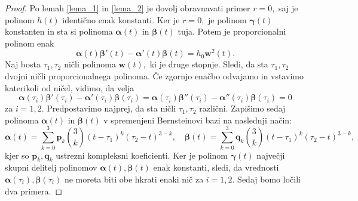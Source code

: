 \documentclass[12pt,a4paper,twoside]{article}
\theoremstyle{definition} %
\theoremstyle{plain} %
\numberwithin{equation}{section}  %
\newcommand{\pV}{\mathbf{p}}
\newcommand{\qV}{\mathbf{q}}
\newcommand{\wV}{\mathbf{w}}
\newcommand{\balpha}{\boldsymbol \alpha}
\newcommand{\bbeta}{\boldsymbol \beta}
\newcommand{\bgamma}{\boldsymbol \gamma}
\begin{document}
\begin{proof}
	Po lemah \ref{lema_1} in \ref{lema_2} je dovolj obravnavati primer $r=0,$ saj je polinom $h(t)$ identično enak konstanti. Ker je $r=0,$ je polinom $\bgamma(t)$ konstanten in sta si polinoma $\balpha(t)$ in $\bbeta(t)$ tuja. Potem je proporcionalni polinom enak
	\begin{equation}
		\balpha(t)\bbeta'(t)-\balpha'(t)\bbeta(t)=h_0\wV^2(t).
	\end{equation}
	Naj bosta $\tau_1,\tau_2$ ničli polinoma $\wV(t),$ ki je druge stopnje. Sledi, da sta $\tau_1,\tau_2$ dvojni ničli proporcionalnega polinoma. Če zgornjo enačbo odvajamo in vstavimo katerikoli od ničel, vidimo, da velja
	\begin{equation}
		\label{enacbe_propoly_tau}
		\balpha(\tau_i)\bbeta'(\tau_i)-\balpha'(\tau_i)\bbeta(\tau_i)=\balpha(\tau_i)\bbeta''(\tau_i)-\balpha''(\tau_i)\bbeta(\tau_i)=0
	\end{equation}
	za $i=1,2.$ Predpostavimo najprej, da sta ničli $\tau_1,\tau_2$ različni. Zapišimo sedaj polinoma $\balpha(t)$ in $\bbeta(t)$ v spremenjeni Bernsteinovi bazi na naslednji način:
	\begin{equation*}
		\balpha(t)=\sum_{k=0}^3\pV_k\binom{3}{k}(t-\tau_1)^k(\tau_2-t)^{3-k},\quad\bbeta(t)=\sum_{k=0}^3\qV_k\binom{3}{k}(t-\tau_1)^k(\tau_2-t)^{3-k},
	\end{equation*}
	kjer so $\pV_k,\qV_k$ ustrezni kompleksni koeficienti. Ker je polinom $\bgamma(t)$ največji skupni delitelj polinomov $\balpha(t),\bbeta(t)$ enak konstanti, sledi, da vrednosti $\balpha(\tau_i),\bbeta(\tau_i)$ ne moreta biti obe hkrati enaki nič za $i=1,2.$ Sedaj bomo ločili dva primera.
	

\end{proof}
\end{document}
